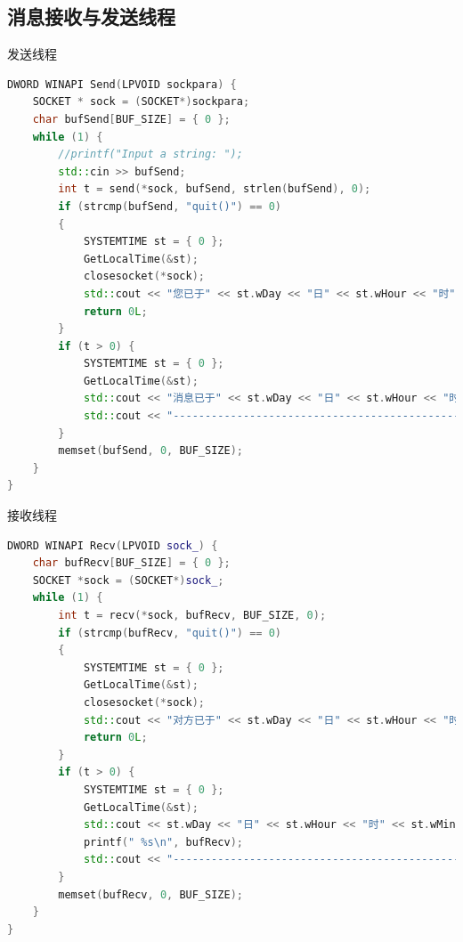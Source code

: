 \documentclass{article}
\begin{document}
\subsection{消息接收与发送线程}
发送线程
\begin{lstlisting}[language = c++]
DWORD WINAPI Send(LPVOID sockpara) {
	SOCKET * sock = (SOCKET*)sockpara;
	char bufSend[BUF_SIZE] = { 0 };
	while (1) {
		//printf("Input a string: ");
		std::cin >> bufSend;
		int t = send(*sock, bufSend, strlen(bufSend), 0);
		if (strcmp(bufSend, "quit()") == 0)
		{
			SYSTEMTIME st = { 0 };
			GetLocalTime(&st);
			closesocket(*sock);
			std::cout << "您已于" << st.wDay << "日" << st.wHour << "时" << st.wMinute << "分" << st.wSecond << "秒退出聊天室" << std::endl;
			return 0L;
		}
		if (t > 0) {
			SYSTEMTIME st = { 0 };
			GetLocalTime(&st);
			std::cout << "消息已于" << st.wDay << "日" << st.wHour << "时" << st.wMinute << "分" << st.wSecond << "秒成功发送\n" ;
			std::cout << "-------------------------------------------------------------" << std::endl;
		}
		memset(bufSend, 0, BUF_SIZE);  
	}
}
\end{lstlisting}
接收线程
\begin{lstlisting}[language = c++]
DWORD WINAPI Recv(LPVOID sock_) {
	char bufRecv[BUF_SIZE] = { 0 };
	SOCKET *sock = (SOCKET*)sock_;
	while (1) {
		int t = recv(*sock, bufRecv, BUF_SIZE, 0);
		if (strcmp(bufRecv, "quit()") == 0)
		{
			SYSTEMTIME st = { 0 };
			GetLocalTime(&st);
			closesocket(*sock);
			std::cout << "对方已于" << st.wDay << "日" << st.wHour << "时" << st.wMinute << "分" << st.wSecond << "秒下线退出聊天室" << std::endl;
			return 0L;
		}
		if (t > 0) {
			SYSTEMTIME st = { 0 };
			GetLocalTime(&st);
			std::cout << st.wDay << "日" << st.wHour << "时" << st.wMinute << "分" << st.wSecond << "秒收到消息:";
			printf(" %s\n", bufRecv);
			std::cout << "-------------------------------------------------------------" << std::endl;
		}
		memset(bufRecv, 0, BUF_SIZE);
	}
}
\end{lstlisting}
\end{document}
